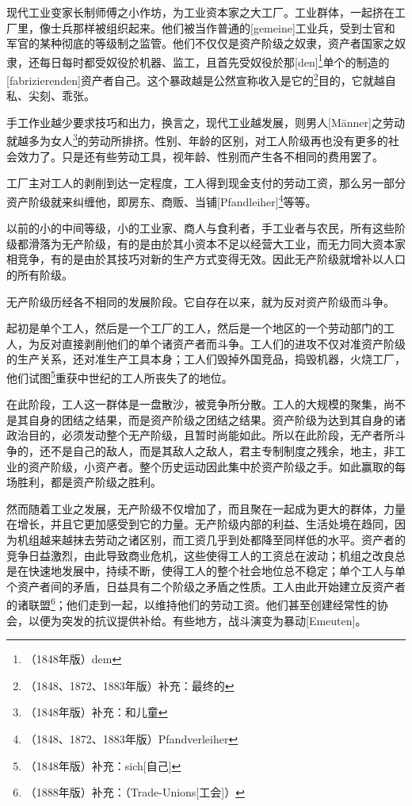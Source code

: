 \documentclass[a4paper,12pt]{ctexart}
\begin{document}

现代工业变家长制师傅之小作坊，为工业资本家之大工厂。工业群体，一起挤在工厂里，像士兵那样被组织起来。他们被当作普通的[gemeine]工业兵，受到士官和军官的某种彻底的等级制之监管。他们不仅仅是资产阶级之奴隶，资产者国家之奴隶，还每日每时都受奴役於机器、监工，且首先受奴役於那[den]\footnote{（1848年版）dem}单个的制造的[fabrizierenden]资产者自己。这个暴政越是公然宣称收入是它的\footnote{（1848、1872、1883年版）补充：最终的}目的，它就越自私、尖刻、乖张。

手工作业越少要求技巧和出力，换言之，现代工业越发展，则男人[Männer]之劳动就越多为女人\footnote{（1848年版）补充：和儿童}的劳动所排挤。性别、年龄的区别，对工人阶级再也没有更多的社会效力了。只是还有些劳动工具，视年龄、性别而产生各不相同的费用罢了。

工厂主对工人的剥削到达一定程度，工人得到现金支付的劳动工资，那么另一部分资产阶级就来纠缠他，即房东、商贩、当铺[Pfandleiher]\footnote{（1848、1872、1883年版）Pfandverleiher}等等。

以前的小的中间等级，小的工业家、商人与食利者，手工业者与农民，所有这些阶级都滑落为无产阶级，有的是由於其小资本不足以经营大工业，而无力同大资本家相竞争，有的是由於其技巧对新的生产方式变得无效。因此无产阶级就增补以人口的所有阶级。


无产阶级历经各不相同的发展阶段。它自存在以来，就为反对资产阶级而斗争。

起初是单个工人，然后是一个工厂的工人，然后是一个地区的一个劳动部门的工人，为反对直接剥削他们的单个诸资产者而斗争。工人们的进攻不仅对准资产阶级的生产关系，还对准生产工具本身；工人们毁掉外国竞品，捣毁机器，火烧工厂，他们试图\footnote{（1848年版）补充：sich[自己]}重获中世纪的工人所丧失了的地位。

在此阶段，工人这一群体是一盘散沙，被竞争所分散。工人的大规模的聚集，尚不是其自身的团结之结果，而是资产阶级之团结之结果。资产阶级为达到其自身的诸政治目的，必须发动整个无产阶级，且暂时尚能如此。所以在此阶段，无产者所斗争的，还不是自己的敌人，而是其敌人之敌人，君主专制制度之残余，地主，非工业的资产阶级，小资产者。整个历史运动因此集中於资产阶级之手。如此赢取的每场胜利，都是资产阶级之胜利。

然而随着工业之发展，无产阶级不仅增加了，而且聚在一起成为更大的群体，力量在增长，并且它更加感受到它的力量。无产阶级内部的利益、生活处境在趋同，因为机组越来越抹去劳动之诸区别，而工资几乎到处都降至同样低的水平。资产者的竞争日益激烈，由此导致商业危机，这些使得工人的工资总在波动；机组之改良总是在快速地发展中，持续不断，使得工人的整个社会地位总不稳定；单个工人与单个资产者间的矛盾，日益具有二个阶级之矛盾之性质。工人由此开始建立反资产者的诸联盟\footnote{（1888年版）补充：（Trade-Unions[工会]）}；他们走到一起，以维持他们的劳动工资。他们甚至创建经常性的协会，以便为突发的抗议提供补给。有些地方，战斗演变为暴动[Emeuten]。
\end{document}
